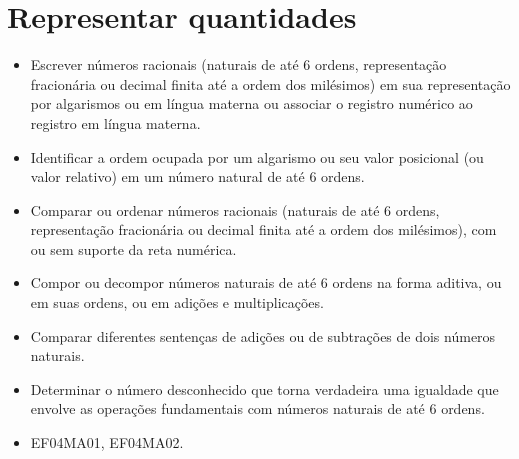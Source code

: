\chapter{Representar quantidades}


\begin{itemize}
\item Escrever números racionais (naturais de até 6 ordens, representação
fracionária ou decimal finita até a ordem dos milésimos) em sua
representação por algarismos ou em língua materna ou associar o registro
numérico ao registro em língua materna.
\item Identificar a ordem ocupada por um algarismo ou seu valor posicional
(ou valor relativo) em um número natural de até 6 ordens.
\item Comparar ou ordenar números racionais (naturais de até 6 ordens,
representação fracionária ou decimal finita até a ordem dos milésimos),
com ou sem suporte da reta numérica.
\item Compor ou decompor números naturais de até 6 ordens na forma aditiva,
ou em suas ordens, ou em adições e multiplicações.
\item Comparar diferentes sentenças de adições ou de subtrações de dois
números naturais.
\item Determinar o número desconhecido que torna verdadeira uma igualdade
que envolve as operações fundamentais com números naturais de até 6
ordens.
\end{itemize}


\begin{itemize}
\item EF04MA01, EF04MA02.
\end{itemize}

